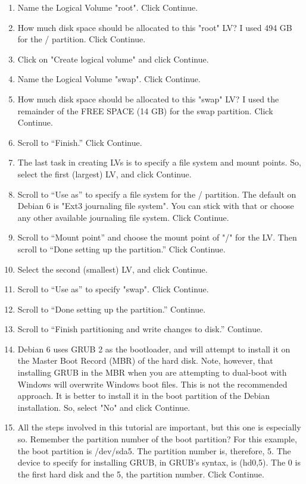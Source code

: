 \documentclass[12pt,notitlepage,onecolumn,oneside,openany,draft]{memoir}
\begin{document}
\begin{enumerate}
\item Name the Logical Volume "root". Click Continue. 
\item How much disk space should be allocated to this "root" LV? I used 494 GB for the / partition. Click Continue. 
\item Click on "Create logical volume" and click Continue. 
\item Name the Logical Volume "swap". Click Continue. 
\item How much disk space should be allocated to this "swap" LV? I used the remainder of the FREE SPACE (14 GB) for the swap partition. Click Continue. 
\item Scroll to “Finish.” Click Continue. 
\item The last task in creating LVs is to specify a file system and mount points. So, select the first (largest) LV, and click Continue. 
\item Scroll to “Use as” to specify a file system for the / partition. The default on Debian 6 is "Ext3 journaling file system". You can stick with that or choose any other available journaling file system. Click Continue. 
\item Scroll to “Mount point” and choose the mount point of "/" for the LV. Then scroll to “Done setting up the partition.” Click Continue. 
\item Select the second (smallest) LV, and click Continue. 
\item Scroll to “Use as” to specify "swap". Click Continue. 
\item Scroll to “Done setting up the partition.” Continue. 
\item Scroll to “Finish partitioning and write changes to disk.” Continue. 
\item Debian 6 uses GRUB 2 as the bootloader, and will attempt to install it on the Master Boot Record (MBR) of the hard disk. Note, however, that installing GRUB in the MBR when you are attempting to dual-boot with Windows will overwrite Windows boot files. This is not the recommended approach. It is better to install it in the boot partition of the Debian installation. So, select "No" and click Continue. 
\item All the steps involved in this tutorial are important, but this one is especially so. Remember the partition number of the boot partition? For this example, the boot partition is /dev/sda5. The partition number is, therefore, 5. The device to specify for installing GRUB, in GRUB’s syntax, is (hd0,5). The 0 is the first hard disk and the 5, the partition number. Click Continue. 

\end{enumerate}
\end{document}
